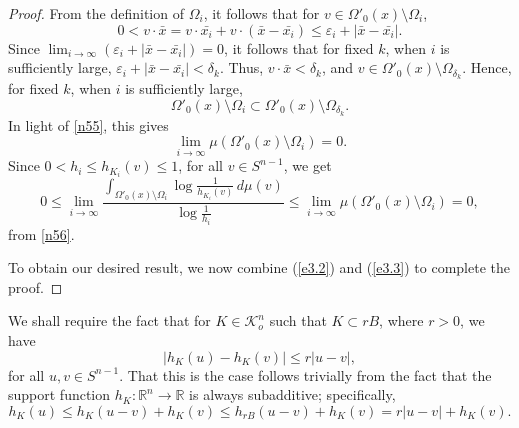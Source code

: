 \documentclass{cpamart1}     %
\theoremstyle{definition}
\theoremstyle{remark}
\newcommand{\rbo}{\mathbb R}
\newcommand{\rn}{\mathbb R^n}
\newcommand{\sn}{S^{n-1}}
\begin{document}
\begin{proof}
From the definition of $\Omega_i$, it follows that
for $v\in\Omega'_0(x)\setminus \Omega_i$,
\[
0<v\cdot \bar{x}= v\cdot \bar{x_i}+v\cdot (\bar{x}-\bar{x_i})
\leq\varepsilon_i+|\bar{x}-\bar{x_i}|.
\]
Since $\lim_{i\to \infty}(\varepsilon_i+|\bar{x}-\bar{x_i}|)=0$,
it follows that for fixed $k$, when $i$ is sufficiently large, $\varepsilon_i+|\bar{x}-\bar{x_i}|<\delta_k$.
Thus, $v\cdot \bar x <\delta_k$, and $v\in \Omega'_0(x) \setminus \Omega_{\delta_k}$.
Hence, for fixed $k$, when $i$ is sufficiently large,
\[
\Omega'_0(x)\setminus \Omega_i \subset  \Omega'_0(x)\setminus \Omega_{\delta_k}.
\]
In light of \eqref{n55}, this gives
\begin{equation}\label{n56}
\lim_{i\to \infty}\mu(\Omega'_0(x)\setminus \Omega_i)=0.
\end{equation}
Since $0<h_i\leq h_{K_i}(v)\le 1$, for all $v\in\sn$, we get
\begin{equation}\label{e3.3}
0\leq \lim_{i\to \infty} \frac{\int_{\Omega'_0(x)\setminus \Omega_i}
\log\frac1{{h_{K_i}(v)}}\, d\mu(v)}{\log \frac1{h_i}}\leq
\lim_{i\to \infty}\mu(\Omega'_0(x)\setminus \Omega_i)=0,
\end{equation}
from \eqref{n56}.

To obtain our desired result, we now
combine (\ref{e3.2}) and (\ref{e3.3}) to complete the proof.
\end{proof}






We shall require the fact that
for $K\in \mathcal{K}_o^n$ such that $K\subset rB$, where $r>0$, we have
\begin{equation}\label{e1.9}
|h_K(u)-h_K(v)|\leq r |u-v|,
\end{equation}
for all $u,v\in S^{n-1}$. That this is the case follows trivially from the fact
 that the support function $h_K:\rn\to\rbo$ is always subadditive; specifically,
\[
h_K(u) \le h_K(u-v) + h_K(v) \le h_{rB}(u-v) + h_K(v) = r|u-v| + h_K(v).
\]
\end{document}
